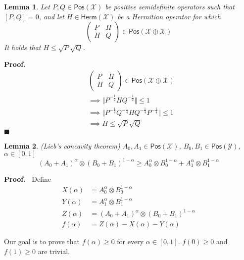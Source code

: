 \documentclass[aps,pra,onecolumn,notitlepage,superscriptaddress]{revtex4-1}
\newcommand{\spc}[1]{\mathcal{#1}}
\newcommand{\Pos}{\mathsf{Pos}}
\newcommand{\Herm}{\mathsf{Herm}}
\newtheorem{lemma}{Lemma}
\def\Proof{{\bf Proof.~}}
\def\qed{$\blacksquare$ \newline}
\begin{document}
    \begin{lemma}
        Let $P,Q \in \Pos(\spc X)$ be positive semidefinite operators such that $[P,Q] = 0$, and let $H \in \Herm(\spc X)$ be a Hermitian operator for which
        \begin{equation}
            \begin{pmatrix}
                P & H \\
                H & Q
            \end{pmatrix} 
            \in \Pos(\spc X \oplus \spc X)
        \end{equation}
        It holds that $H \leq \sqrt P \sqrt Q$.
    \end{lemma}
    \Proof
    \begin{align*}
        &\begin{pmatrix}
            P & H \\
            H & Q
        \end{pmatrix} 
        \in \Pos(\spc X \oplus \spc X) \\
        &\implies \Vert P^{-\frac 1 2} H Q^{-\frac 1 2} \Vert \leq 1 \\
        &\implies \Vert P^{-\frac 1 4}Q^{-\frac 1 4} H Q^{-\frac 1 4}P^{-\frac 1 4} \Vert \leq 1 \\
        &\implies H \leq \sqrt P \sqrt Q
    \end{align*}
    \qed

    \begin{lemma}
        (Lieb’s concavity theorem) $A_0, A_1 \in \Pos(\spc X)$, $B_0, B_1 \in \Pos(\spc Y)$, $\alpha \in [0,1]$
        \begin{equation}
            (A_0 + A_1)^\alpha \otimes (B_0 + B_1)^{1-\alpha} \geq A_0^\alpha \otimes B_0^{1-\alpha} + A_1^\alpha \otimes B_1^{1-\alpha} 
        \end{equation}
    \end{lemma}
    \Proof
    Define
    \begin{align*}
        X(\alpha) &= A_0^\alpha \otimes B_0^{1-\alpha} \\
        Y(\alpha) &= A_1^\alpha \otimes B_1^{1-\alpha} \\
        Z(\alpha) &= (A_0 + A_1)^\alpha \otimes (B_0 + B_1)^{1-\alpha} \\
        f(\alpha) &= Z(\alpha) - X(\alpha) - Y(\alpha)
    \end{align*}

    Our goal is to prove that $f(\alpha) \geq 0$ for every $\alpha \in [0,1]$. $f(0) \geq 0$ and $f(1) \geq 0$ are trivial.
\end{document}

